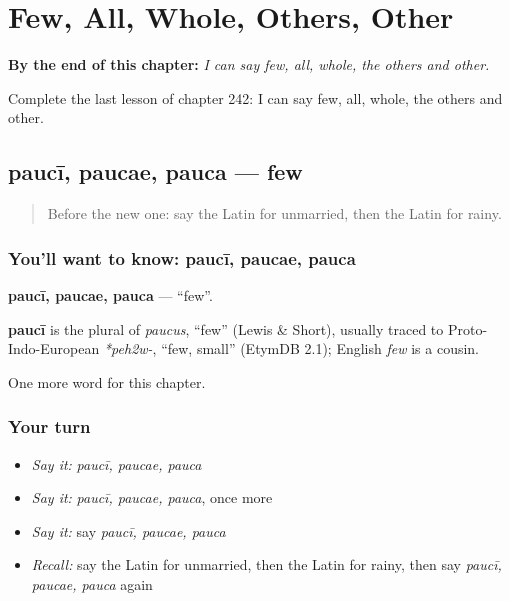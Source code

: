 
\chapter{Few, All, Whole, Others, Other}
\label{ch:la-few-all-whole-others-other}

\begin{chapteropening}
\textbf{By the end of this chapter:} \emph{I can say few, all, whole, the others and other.}

Complete the last lesson of chapter 242: I can say few, all, whole, the others and other.
\end{chapteropening}

\section[paucī, paucae, pauca]{paucī, paucae, pauca — few}

\label{lesson:LA-C242-pauci}



\begin{quote}
Before the new one: say the Latin for unmarried, then the Latin for rainy.
\end{quote}

\subsection*{You'll want to know: paucī, paucae, pauca}
\textbf{paucī, paucae, pauca} — \textquotedblleft{}few\textquotedblright{}.

\begin{cousinweb}
\textbf{paucī} is the plural of \emph{paucus}, \textquotedblleft{}few\textquotedblright{} (Lewis \& Short), usually traced to Proto-Indo-European \emph{*peh2w-}, \textquotedblleft{}few, small\textquotedblright{} (EtymDB 2.1); English \emph{few} is a cousin.
\end{cousinweb}

\begin{grammarlens}[title={What you've built}]
One more word for this chapter.
\end{grammarlens}

\subsection*{Your turn}
\begin{itemize}
\raggedright
  \item \emph{Say it:} \emph{paucī, paucae, pauca}
  \item \emph{Say it:} \emph{paucī, paucae, pauca}, once more
  \item \emph{Say it:} say \emph{paucī, paucae, pauca}
  \item \emph{Recall:} say the Latin for unmarried, then the Latin for rainy, then say \emph{paucī, paucae, pauca} again
\end{itemize}

